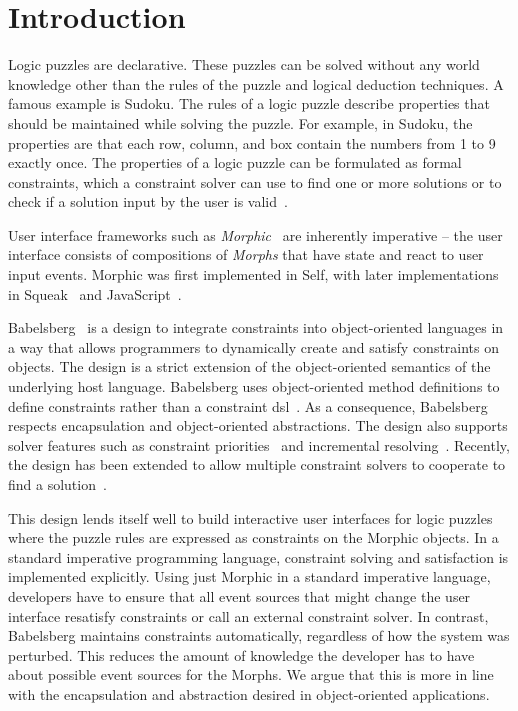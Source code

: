 \section{Introduction}
\label{sec:introduction}

Logic puzzles are declarative. These puzzles can be solved without any
world knowledge other than the rules of the puzzle and logical
deduction techniques. A famous example is Sudoku. The rules of a logic
puzzle describe properties that should be maintained while solving the
puzzle. For example, in Sudoku, the properties are that each row,
column, and box contain the numbers from 1 to 9 exactly once. The
properties of a logic puzzle can be formulated as formal constraints,
which a constraint solver can use to find one or more solutions or to
check if a solution input by the user is valid~\cite{lynce2006sudoku}.

User interface frameworks such as
\emph{Morphic}~\cite{maloney1995morphic} are inherently imperative --
the user interface consists of compositions of \emph{Morphs} that have
state and react to user input events. Morphic was first implemented in
Self, with later implementations in
Squeak~\cite{maloney2001introduction} and
JavaScript~\cite{taivalsaari2008web}.

Babelsberg~\cite{felgentreff2014jot} is a design to integrate
constraints into object-oriented languages in a way that
allows programmers to dynamically create and satisfy constraints on
objects. The design is a strict extension of the object-oriented
semantics of the underlying host language. Babelsberg uses
object-oriented method definitions to define constraints rather than a
constraint \ac{dsl}~\cite{Squander,Enaml,AppleCocoaAutoLayout}. As a
consequence, Babelsberg respects encapsulation and object-oriented
abstractions. The design also supports solver features such as
constraint priorities~\cite{borning-lisp-symbolic-computation-1992} and
incremental resolving~\cite{freeman1990incremental}. Recently, the
design has been extended to allow multiple constraint solvers to
cooperate to find a solution~\cite{felgentreff2014babelsbergjs}.

This design lends itself well to build interactive user interfaces for
logic puzzles where the puzzle rules are expressed as constraints on
the Morphic objects. In a standard imperative programming language,
constraint solving and satisfaction is implemented explicitly. Using
just Morphic in a standard imperative language, developers have to
ensure that all event sources that might change the user interface
resatisfy constraints or call an external constraint solver. In
contrast, Babelsberg maintains constraints automatically, regardless
of how the system was perturbed. This reduces the amount of knowledge
the developer has to have about possible event sources for the
Morphs. We argue that this is more in line with the encapsulation and
abstraction desired in object-oriented applications.

